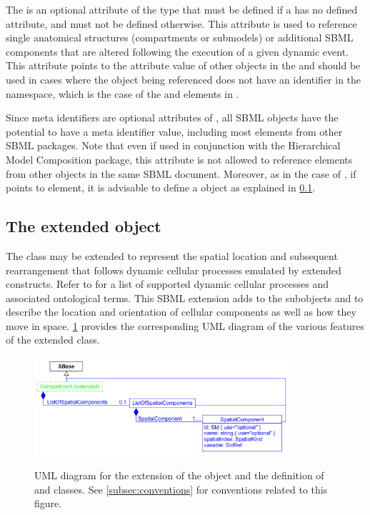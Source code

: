 The  is an optional attribute of the type  that must be defined if a \DynElement has no defined  attribute, and must not be defined otherwise. This attribute is used to reference single anatomical structures (compartments or submodels) or additional SBML components that are altered following the execution of a given dynamic event. This attribute points to the  attribute value of other objects in the \Model and should be used in cases where the object being referenced does not have an identifier in the \Model {} namespace, which is the case of the \UnitDefinition and \LocalParameter elements in \sbmlthreecore.

Since meta identifiers are optional attributes of \SBase, all SBML objects have the potential to have a meta identifier value, including most elements from other SBML packages. Note that even if used in conjunction with the Hierarchical Model Composition package, this attribute is not allowed to reference elements from other \Model objects in the same SBML document. Moreover, as in the case of , if  points to \Compartment element, it is advisable to define a \ListOfSpatialComponents object as explained in \ref{subsec:extCompartment}.

\subsection{The extended  object}
\label{subsec:extCompartment}

The \Compartment class may be extended to represent the spatial location and subsequent rearrangement that follows dynamic cellular processes emulated by extended \Event constructs. Refer to  for a list of supported dynamic cellular processes and associated ontological terms. This SBML extension adds to \Compartment the subobjects \ListOfSpatialComponents and \SpatialComponent to describe the location and orientation of cellular components as well as how they move in space. \ref{fig:UMLExtendedCompartment} provides the corresponding UML diagram of the various features of the extended \Compartment class. 

\begin{figure}[tbhp]
	\centering
	\includegraphics[width=0.85\textwidth]{images/UMLExtendedCompartment.pdf}\\
	\caption{UML diagram for the extension of the \Compartment object and the definition of \ListOfSpatialComponents and \SpatialComponent classes. See \ref{subsec:conventions} for conventions related to this figure.} \label{fig:UMLExtendedCompartment}
\end{figure}

